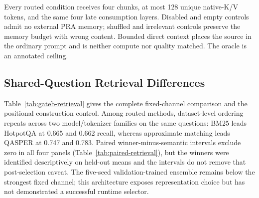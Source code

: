 \documentclass[11pt]{article}
\begin{document}
Every routed condition receives four chunks, at most 128 unique native-K/V tokens, and the same four late consumption layers. Disabled and empty controls admit no external PRA memory; shuffled and irrelevant controls preserve the memory budget with wrong content. Bounded direct context places the source in the ordinary prompt and is neither compute nor quality matched. The oracle is an annotated ceiling.

\subsection{Shared-Question Retrieval Differences}
Table~\ref{tab:gateb-retrieval} gives the complete fixed-channel comparison and the positional construction control. Among routed methods, dataset-level ordering repeats across two model/tokenizer families on the same questions: BM25 leads HotpotQA at 0.665 and 0.662 recall, whereas approximate matching leads QASPER at 0.747 and 0.783. Paired winner-minus-semantic intervals exclude zero in all four panels (Table~\ref{tab:paired-retrieval}), but the winners were identified descriptively on held-out means and the intervals do not remove that post-selection caveat. The five-seed validation-trained ensemble remains below the strongest fixed channel; this architecture exposes representation choice but has not demonstrated a successful runtime selector.

\begin{table}[H]
\centering
\small
\caption{Annotation-constructed held-out evidence recall, 50 shared question identities per dataset and model. Bold marks the best routed fixed channel; Pos.-4 selects the first four chunks without retrieval. All conditions use at most four chunks.}
\label{tab:gateb-retrieval}
\end{table}
\end{document}
